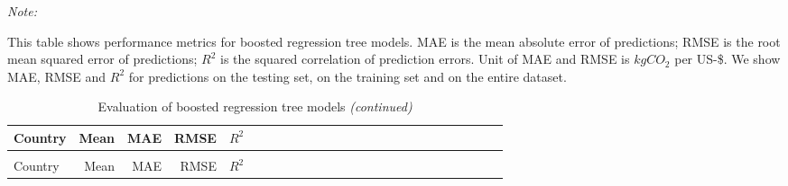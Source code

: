 \begingroup\fontsize{8}{10}\selectfont

\begin{ThreePartTable}
\begin{TableNotes}
\item \textit{Note: } 
\item This table shows performance metrics for boosted regression tree models. MAE is the mean absolute error of predictions; RMSE is the root mean squared error of predictions; $R^{2}$ is the squared correlation of prediction errors. Unit of MAE and RMSE is $kgCO_{2}$ per US-\$. We show MAE, RMSE and $R^{2}$ for predictions on the testing set, on the training set and on the entire dataset. 
\end{TableNotes}
\begin{longtable}[t]{l|r|rrrl|r|rrrl|r|rrrl|r|rrrl|r|rrr}
\caption{\label{tab:A8}Evaluation of boosted regression tree models}\\
\toprule
Country & Mean & MAE & RMSE & $R^{2}$\\
\midrule
\endfirsthead
\caption[]{Evaluation of boosted regression tree models \textit{(continued)}}\\
\toprule
Country & Mean & MAE & RMSE & $R^{2}$\\
\midrule
\endhead


\end{longtable}
\end{ThreePartTable}
